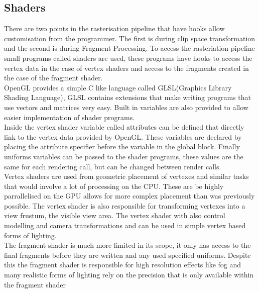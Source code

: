 \subsection{Shaders}
There are two points in the rasterisation pipeline that have hooks allow 
customisation from the programmer. The first is during clip space transformation
and the second is during Fragment Processing. To access the rasteriation pipeline
small programs called shaders are used, these programs have hooks to access the
vertex data in the case of vertex shaders and access to the fragments created in
the case of the fragment shader.\\

OpenGL provides a simple C like language called GLSL(Graphics Library Shading 
Language), GLSL contains extensions that make writing programs that use vectors
and matrices very easy. Built in variables are also provided to allow easier
implementation of shader programs. \\



Inside the vertex shader variable called attributes can be defined that directly
link to the vertex data provided by OpenGL. These variables are declared by 
placing the attribute specifier before the variable in the global block. Finally
uniforms variables can be passed to the shader programs, these values are the 
same for each rendering call, but can be changed between render calls.\\

Vertex shaders are used from geometric placement of vertexes and similar tasks
that would involve a lot of processing on the CPU. These are be highly 
parrallelised on the GPU allows for more complex placement than was previously
possible. The vertex shader is also responsible for transforming vertexes into
a view frustum, the visible view area. The vertex shader with also control 
modelling and camera transformations and can be used in simple vertex based forms
of lighting.\\

The fragment shader is much more limited in its scope, it only has access to the
final fragments before they are written and any used specified uniforms. Despite
this the fragment shader is responsible for high resolution effects like fog and
many realistic forms of lighting rely on the precision that is only available
within the fragment shader\\



